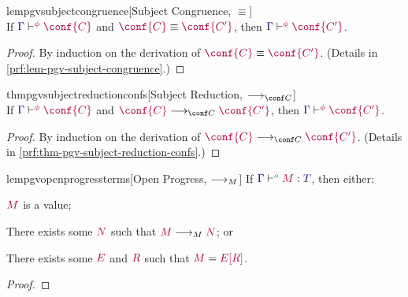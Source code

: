 \documentclass[main.tex]{subfiles}
\begin{document}
\begin{restatablelemma}{lempgvsubjectcongruence}[Subject Congruence, $\equiv$]
  \label{lem:pgv-subject-congruence}
  \hfill\\%
  If $\cseq[\phi]{\ty{\Gamma}}{\conf{C}}$ and $\tm{\conf{C}}\equiv\tm{\conf{C'}}$,
  then $\cseq[\phi]{\ty{\Gamma}}{\conf{C'}}$.
\end{restatablelemma}
\begin{proof}
  By induction on the derivation of $\tm{\conf{C}}\equiv\tm{\conf{C'}}$.
  (Details in \cref{prf:lem-pgv-subject-congruence}.)
\end{proof}

\begin{restatabletheorem}{thmpgvsubjectreductionconfs}[Subject Reduction, $\cred$]
  \label{thm:pgv-subject-reduction-confs}
  \hfill\\%
  If $\cseq[\phi]{\ty{\Gamma}}{\conf{C}}$ and $\tm{\conf{C}}\cred\tm{\conf{C'}}$,
  then $\cseq[\phi]{\ty{\Gamma}}{\conf{C'}}$.
\end{restatabletheorem}
\begin{proof}
  By induction on the derivation of $\tm{\conf{C}}\cred\tm{\conf{C'}}$.
  (Details in \cref{prf:thm-pgv-subject-reduction-confs}.)
\end{proof}

\begin{restatablelemma}{lempgvopenprogressterms}[Open Progress, $\longrightarrow_{M}$]
  \label{lem:pgv-open-progress-terms}
  If $\tseq[\cs{o}]{\ty{\Gamma}}{M}{T}$, then either:
  \begin{description}[labelwidth=8ex]
  \item[Done]
    $\tm{M}$ is a value;
  \item[Step]
    There exists some $\tm{N}$ such that $\tm{M}\tred\tm{N}$; or
  \item[Blocked]
    There exists some $\tm{E}$ and $\tm{R}$ such that $\tm{M}=\tm{\plug{E}{R}}$.
  \end{description}
\end{restatablelemma}
\begin{proof}
  \admit
\end{proof}
\end{document}
